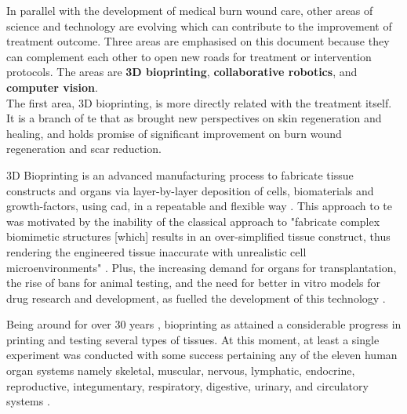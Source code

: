 In parallel with the development of medical burn wound care, other areas of science and technology are evolving which can contribute to the improvement of treatment outcome. Three areas are emphasised on this document because they can complement each other to open new roads for treatment or intervention protocols. The areas are \textbf{3D bioprinting}, \textbf{collaborative robotics}, and \textbf{computer vision}.\\

The first area, 3D bioprinting, is more directly related with the treatment itself. It is a branch of \gls{te} that as brought new perspectives on skin regeneration and healing, and holds promise of significant improvement on burn wound regeneration and scar reduction. 

3D Bioprinting is an advanced manufacturing process to fabricate tissue constructs and organs via layer-by-layer deposition of cells, biomaterials and growth-factors, using \gls{cad}, in a repeatable and flexible way \cite{Ng2016_skin_bioprint_reality_fantasy}. This approach to \gls{te} was motivated by the inability of the classical approach to "fabricate complex biomimetic structures [which] results in an over-simplified tissue construct, thus rendering the engineered tissue inaccurate with unrealistic cell microenvironments" \cite{Vijayavenkataraman2018_bioprinting_tissues_organs_regen_med}. Plus, the increasing demand for organs for transplantation, the rise of bans for animal testing, and the need for better in vitro models for drug research and development, as fuelled the development of this technology \cite{Vijayavenkataraman2018_bioprinting_tissues_organs_regen_med}.

Being around for over 30 years \cite{Ozbolat2017_evaluation_bioprinter_tech}, bioprinting as attained a considerable progress in printing and testing several types of tissues. At this moment, at least a single experiment was conducted with some success pertaining any of the eleven human organ systems namely skeletal, muscular, nervous, lymphatic, endocrine, reproductive, integumentary, respiratory, digestive, urinary, and circulatory systems \cite{Vijayavenkataraman2018_bioprinting_tissues_organs_regen_med}.

